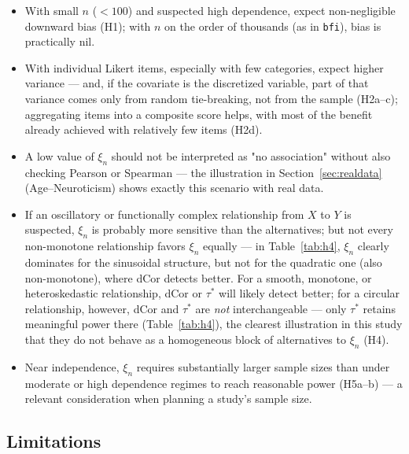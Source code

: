 \documentclass[article]{ajs}
\begin{document}
\begin{itemize}
\item With small $n$ ($<100$) and suspected high dependence, expect
  non-negligible downward bias (H1); with $n$ on the order of
  thousands (as in \texttt{bfi}), bias is practically nil.
\item With individual Likert items, especially with few categories,
  expect higher variance --- and, if the covariate is the discretized
  variable, part of that variance comes only from random tie-breaking,
  not from the sample (H2a--c); aggregating items into a composite
  score helps, with most of the benefit already achieved with
  relatively few items (H2d).
\item A low value of $\xi_n$ should not be interpreted as "no
  association" without also checking Pearson or Spearman --- the
  illustration in Section~\ref{sec:realdata} (Age--Neuroticism) shows
  exactly this scenario with real data.
\item If an oscillatory or functionally complex relationship from $X$
  to $Y$ is suspected, $\xi_n$ is probably more sensitive than the
  alternatives; but not every non-monotone relationship favors $\xi_n$
  equally --- in Table~\ref{tab:h4}, $\xi_n$ clearly dominates for the
  sinusoidal structure, but not for the quadratic one (also
  non-monotone), where dCor detects better. For a smooth, monotone, or
  heteroskedastic relationship, dCor or $\tau^\ast$ will likely detect
  better; for a circular relationship, however, dCor and $\tau^\ast$
  are \emph{not} interchangeable --- only $\tau^\ast$ retains
  meaningful power there (Table~\ref{tab:h4}), the clearest
  illustration in this study that they do not behave as a homogeneous
  block of alternatives to $\xi_n$ (H4).
\item Near independence, $\xi_n$ requires substantially larger sample
  sizes than under moderate or high dependence regimes to reach
  reasonable power (H5a--b) --- a relevant consideration when planning
  a study's sample size.
\end{itemize}

\subsection{Limitations}
\end{document}
